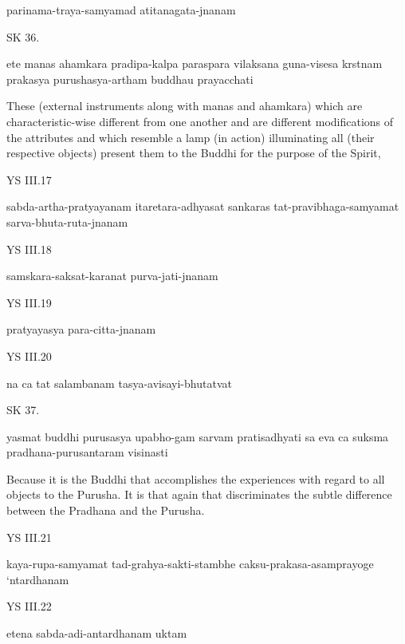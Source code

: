 parinama-traya-samyamad atitanagata-jnanam

SK 36.

ete manas ahamkara pradipa-kalpa paraspara vilaksana
guna-visesa krstnam prakasya purushasya-artham buddhau prayacchati

These (external instruments along with manas and ahamkara)
which are characteristic-wise different from one another
and are different modifications of the attributes
and which resemble a lamp (in action)
illuminating all (their respective objects)
present them to the Buddhi for the purpose of the Spirit,

YS III.17

sabda-artha-pratyayanam itaretara-adhyasat sankaras
tat-pravibhaga-samyamat sarva-bhuta-ruta-jnanam

YS III.18

samskara-saksat-karanat purva-jati-jnanam

YS III.19

pratyayasya para-citta-jnanam

YS III.20

na ca tat salambanam tasya-avisayi-bhutatvat

SK 37.

yasmat buddhi purusasya upabho-gam sarvam pratisadhyati
sa eva ca suksma pradhana-purusantaram visinasti

Because it is the Buddhi that accomplishes the experiences
with regard to all objects to the Purusha.
It is that again that discriminates the subtle difference
between the Pradhana and the Purusha.

YS III.21

kaya-rupa-samyamat tad-grahya-sakti-stambhe
caksu-prakasa-asamprayoge ‘ntardhanam

YS III.22

etena sabda-adi-antardhanam uktam
